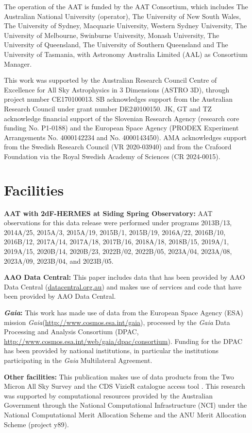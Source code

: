 \documentclass[
  journal=pasa,
  manuscript=research-paper, %
  year=2024,
  volume=37
]{cup-journal}
\newcommand{\Gaia}{\textit{Gaia}\xspace}
\begin{document}
The operation of the AAT is funded by the AAT Consortium, which includes The Australian National University (operator), The University of New South Wales, The University of Sydney, Macquarie University, Western Sydney University, The University of Melbourne, Swinburne University, Monash University, The University of Queensland, The University of Southern Queensland and The University of Tasmania, with Astronomy Australia Limited (AAL) as Consortium Manager.

This work was supported by the Australian Research Council Centre of Excellence for All Sky Astrophysics in 3 Dimensions (ASTRO 3D), through project number CE170100013. SB acknowledges support from the Australian Research Council under grant number DE240100150. JK, GT and TZ acknowledge financial support of the Slovenian Research Agency (research core funding No. P1-0188) and the European Space Agency (PRODEX Experiment Arrangements No. 4000142234 and No. 4000143450). AMA acknowledges support from the Swedish Research Council (VR 2020-03940) and from the Crafoord Foundation via the Royal Swedish Academy of Sciences (CR 2024-0015).

\section*{Facilities}

\textbf{AAT with 2dF-HERMES at Siding Spring Observatory:}
AAT observations for this data release were performed under programs {2013B/13}, {2014A/25}, {2015A/3}, {2015A/19}, {2015B/1}, {2015B/19}, {2016A/22}, {2016B/10}, {2016B/12}, {2017A/14}, {2017A/18}, {2017B/16}, {2018A/18}, {2018B/15}, {2019A/1}, {2019A/15}, {2020B/14}, {2020B/23}, {2022B/02}, {2022B/05}, {2023A/04}, {2023A/08}, {2023A/09}, {2023B/04}, and {2023B/05}.

\textbf{AAO Data Central:} This paper includes data that has been provided by AAO Data Central  (\url{datacentral.org.au}) and makes use of services and code that have been provided by AAO Data Central.

\textbf{\Gaia: } This work has made use of data from the European Space Agency (ESA) mission \Gaia (\url{http://www.cosmos.esa.int/gaia}), processed by the \Gaia Data Processing and Analysis Consortium (DPAC, \url{http://www.cosmos.esa.int/web/gaia/dpac/consortium}). Funding for the DPAC has been provided by national institutions, in particular the institutions participating in the \Gaia Multilateral Agreement. 

\textbf{Other facilities:} This publication makes use of data products from the Two Micron All Sky Survey \citep{Skrutskie2006} and the CDS VizieR catalogue access tool \citep{Vizier2000}. This research was supported by computational resources provided by the Australian Government through the National Computational Infrastructure (NCI) under the National Computational Merit Allocation Scheme and the ANU Merit Allocation Scheme (project y89).
\end{document}
